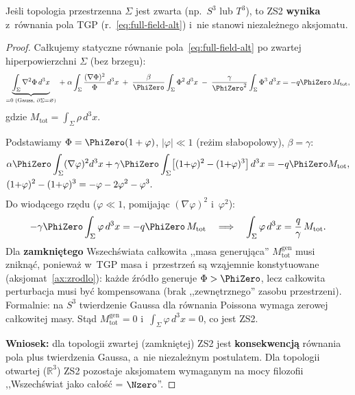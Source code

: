 \begin{proposition}%
\label{prop:ZS2-from-dynamics}
Je\.sli topologia przestrzenna $\Sigma$ jest zwarta (np.~$S^3$ lub $T^3$),
to ZS2 \textbf{wynika} z~r\'ownania pola TGP
(r.~\eqref{eq:full-field-alt}) i~nie stanowi niezale\.znego aksjomatu.
\end{proposition}

\begin{proof}
Ca\l{}kujemy statyczne r\'ownanie pola~\eqref{eq:full-field-alt}
po zwartej hiperpowierzchni $\Sigma$ (bez brzegu):
\begin{equation}\label{eq:ZS2-integral}
  \underbrace{\int_\Sigma \nabla^2\Phi\,d^3x}_{= 0\;\text{(Gauss, }\partial\Sigma = \varnothing\text{)}}
  \;+\; \alpha\int_\Sigma \frac{(\nabla\Phi)^2}{\Phi}\,d^3x
  \;+\; \frac{\beta}{\PhiZero}\int_\Sigma \Phi^2\,d^3x
  \;-\; \frac{\gamma}{\PhiZero^2}\int_\Sigma \Phi^3\,d^3x
  = -q\PhiZero\,M_{\mathrm{tot}},
\end{equation}
gdzie $M_{\mathrm{tot}} = \int_\Sigma \rho\,d^3x$.

Podstawiamy $\Phi = \PhiZero(1 + \varphi)$,
$|\varphi| \ll 1$ (re\.zim s\l{}abopolowy), $\beta = \gamma$:
\begin{align*}
  &\alpha\PhiZero\int_\Sigma (\nabla\varphi)^2 d^3x
  + \gamma\PhiZero \int_\Sigma
  \bigl[(1{+}\varphi)^2 - (1{+}\varphi)^3\bigr]\,d^3x
  = -q\PhiZero M_{\mathrm{tot}},\\
  &(1{+}\varphi)^2 - (1{+}\varphi)^3
  = -\varphi - 2\varphi^2 - \varphi^3.
\end{align*}
Do wiod\k{a}cego rz\k{e}du ($\varphi \ll 1$,
pomijaj\k{a}c $(\nabla\varphi)^2$ i~$\varphi^2$):
\begin{equation}\label{eq:ZS2-leading}
  -\gamma\PhiZero \int_\Sigma \varphi\,d^3x
  = -q\PhiZero\,M_{\mathrm{tot}}
  \quad\Longrightarrow\quad
  \int_\Sigma \varphi\,d^3x
  = \frac{q}{\gamma}\,M_{\mathrm{tot}}.
\end{equation}
Dla \textbf{zamkni\k{e}tego} Wszech\'swiata
ca\l{}kowita ,,masa generuj\k{a}ca''
$M_{\mathrm{tot}}^{\mathrm{gen}}$ musi znikn\k{a}\'c,
poniewa\.z w~TGP masa i~przestrze\'n
s\k{a} wz\k{a}jemnie konstytuowane
(aksjomat~\ref{ax:zrodlo}):
ka\.zde \'zr\'od\l{}o generuje $\Phi > \PhiZero$,
lecz ca\l{}kowita perturbacja musi by\'c kompensowana
(brak ,,zewn\k{e}trznego'' zasobu przestrzeni).
Formalnie: na $S^3$ twierdzenie Gaussa
dla r\'ownania Poissona wymaga zerowej ca\l{}kowitej masy.
St\k{a}d $M_{\mathrm{tot}}^{\mathrm{gen}} = 0$
i~$\int_\Sigma \varphi\,d^3x = 0$, co jest ZS2.

\medskip\noindent
\textbf{Wniosek:} dla topologii zwartej (zamkni\k{e}tej)
ZS2 jest \textbf{konsekwencj\k{a}} r\'ownania pola plus
twierdzenia Gaussa, a~nie niezale\.znym postulatem.
Dla topologii otwartej ($\mathbb{R}^3$) ZS2 pozostaje
aksjomatem wymaganym na mocy filozofii
,,Wszech\'swiat jako ca\l{}o\'s\'c = $\Nzero$''.
\end{proof}

